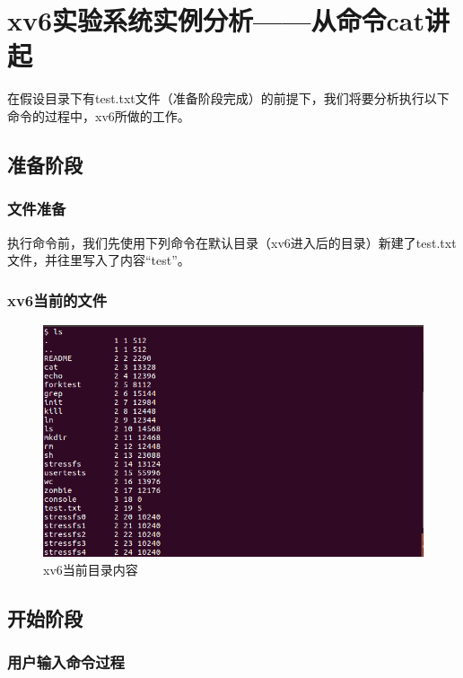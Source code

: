 \chapter{xv6实验系统实例分析——从命令cat讲起}

在假设目录下有test.txt文件（准备阶段完成）的前提下，我们将要分析执行以下命令的过程中，xv6所做的工作。


\section{准备阶段}

\subsection{文件准备}

执行命令前，我们先使用下列命令在默认目录（xv6进入后的目录）新建了test.txt文件，并往里写入了内容“test”。


\subsection{xv6当前的文件}

\begin{figure}[H]
  \centering
  \includegraphics[width=6in]{figures/eg/files.png}
  \caption{xv6当前目录内容}
\end{figure}

\section{开始阶段}

\subsection{用户输入命令过程}

